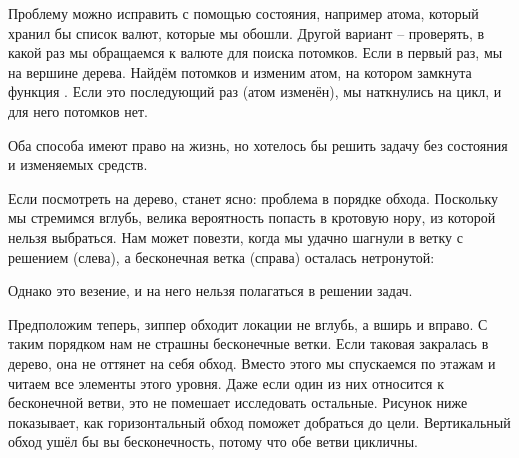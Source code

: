 Проблему можно исправить с помощью состояния, например атома, который хранил бы
список валют, которые мы обошли. Другой вариант – проверять, в какой раз мы
обращаемся к валюте  для поиска потомков. Если в первый раз, мы на вершине
дерева. Найдём потомков и изменим атом, на котором замкнута функция
. Если это последующий раз (атом изменён), мы наткнулись на цикл, и
для него потомков нет.

Оба способа имеют право на жизнь, но хотелось бы решить задачу без состояния и
изменяемых средств.

Если посмотреть на дерево, станет ясно: проблема в порядке обхода. Поскольку мы
стремимся вглубь, велика вероятность попасть в кротовую нору, из которой нельзя
выбраться. Нам может повезти, когда мы удачно шагнули в ветку с решением
(слева), а бесконечная ветка (справа) осталась нетронутой:


Однако это везение, и на него нельзя полагаться в решении задач.

Предположим теперь, зиппер обходит локации не вглубь, а вширь и вправо. С таким
порядком нам не страшны бесконечные ветки. Если таковая закралась в дерево, она
не оттянет на себя обход. Вместо этого мы спускаемся по этажам и читаем все
элементы этого уровня. Даже если один из них относится к бесконечной ветви, это
не помешает исследовать остальные. Рисунок ниже показывает, как горизонтальный
обход поможет добраться до цели. Вертикальный обход ушёл бы вы бесконечность,
потому что обе ветви цикличны.


